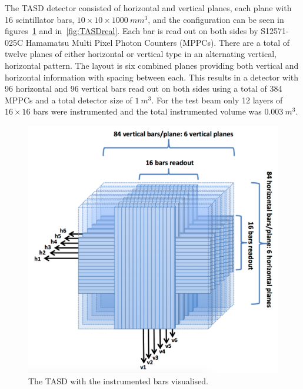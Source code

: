 The TASD detector consisted of horizontal and vertical planes, each plane with 16 scintillator bars, $10\times10\times1000~mm^3$, and the configuration can be seen in figures~\ref{fig:TASD} and in~\ref{fig:TASDreal}. Each bar is read out on both sides by S12571-025C Hamamatsu Multi Pixel Photon Counters (MPPCs). There are a total of twelve planes of either horizontal or vertical type in an alternating vertical, horizontal pattern. The layout is six combined planes providing both vertical and horizontal information with spacing between each. This results in a detector with 96 horizontal and 96 vertical bars read out on both sides using a total of 384 MPPCs and a total detector size of $1~m^3$.  For the test beam only 12 layers of $16 \times 16$ bars were instrumented and the total instrumented volume was $0.003~m^3$.


\begin{figure}[h!]
\centering
\includegraphics[width=\textwidth]{figures/AIDA.png}
\caption{The TASD with the instrumented bars visualised.}
\label{fig:TASD}
\end{figure}

